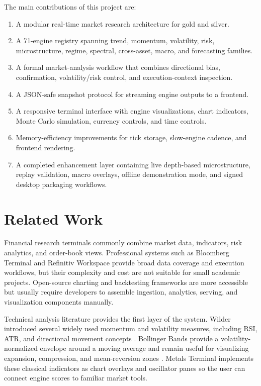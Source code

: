 \documentclass[conference]{IEEEtran}
\begin{document}
The main contributions of this project are:
\begin{enumerate}
  \item A modular real-time market research architecture for gold and silver.
  \item A 71-engine registry spanning trend, momentum, volatility, risk,
  microstructure, regime, spectral, cross-asset, macro, and forecasting
  families.
  \item A formal market-analysis workflow that combines directional bias,
  confirmation, volatility/risk control, and execution-context inspection.
  \item A JSON-safe snapshot protocol for streaming engine outputs to a
  frontend.
  \item A responsive terminal interface with engine visualizations, chart
  indicators, Monte Carlo simulation, currency controls, and time controls.
  \item Memory-efficiency improvements for tick storage, slow-engine cadence,
  and frontend rendering.
  \item A completed enhancement layer containing live depth-based
  microstructure, replay validation, macro overlays, offline demonstration
  mode, and signed desktop packaging workflows.
\end{enumerate}

\section{Related Work}

Financial research terminals commonly combine market data, indicators, risk
analytics, and order-book views. Professional systems such as Bloomberg
Terminal and Refinitiv Workspace provide broad data coverage and execution
workflows, but their complexity and cost are not suitable for small academic
projects. Open-source charting and backtesting frameworks are more accessible
but usually require developers to assemble ingestion, analytics, serving, and
visualization components manually.

Technical analysis literature provides the first layer of the system.
Wilder introduced several widely used momentum and volatility measures,
including RSI, ATR, and directional movement concepts \cite{wilder1978}.
Bollinger Bands provide a volatility-normalized envelope around a moving
average and remain useful for visualizing expansion, compression, and
mean-reversion zones \cite{bollinger2001}. Metals Terminal implements these
classical indicators as chart overlays and oscillator panes so the user can
connect engine scores to familiar market tools.
\end{document}
